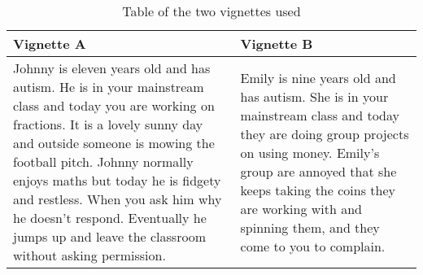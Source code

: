 \begin{table}[H]
    \begin{tabular}{| p{8cm} | p{8cm} |}
    \hline
    \textbf{Vignette A} & \textbf{Vignette B}                                                                                                                                                                             \\    
    \hline
    \hline
    Johnny is eleven years old and has autism. He is in your mainstream class and today you are working on fractions. It is a lovely sunny day and outside someone is mowing the football pitch.  Johnny normally enjoys maths but today he is fidgety and restless.  When you ask him why he doesn't respond.  Eventually he jumps up and leave the classroom without asking permission. & Emily is nine years old and has autism. She is in your mainstream class and today they are doing group projects on using money. Emily's group are annoyed that she keeps taking the coins they are working with and spinning them, and they come to you to complain.\\ 
    \hline
    \end{tabular}
    \caption{Table of the two vignettes used}
\end{table}

